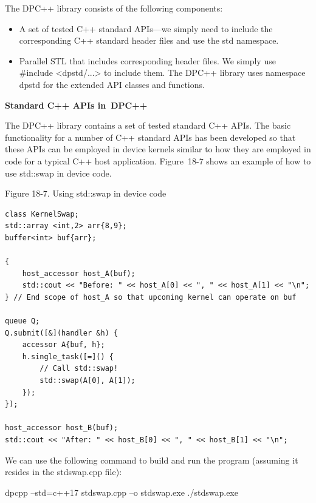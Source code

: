The DPC++ library consists of the following components:\par

\begin{itemize}
	\item A set of tested C++ standard APIs—we simply need to include the corresponding C++ standard header files and use the std namespace.
	\item Parallel STL that includes corresponding header files. We simply use \#include <dpstd/...> to include them. The DPC++ library uses namespace dpstd for the extended API classes and functions.
\end{itemize}

\hspace*{\fill} \par %
\textbf{Standard C++ APIs in DPC++}

The DPC++ library contains a set of tested standard C++ APIs. The basic functionality for a number of C++ standard APIs has been developed so that these APIs can be employed in device kernels similar to how they are employed in code for a typical C++ host application. Figure 18-7 shows an example of how to use std::swap in device code.\par

\hspace*{\fill} \par %
Figure 18-7. Using std::swap in device code
\begin{lstlisting}[caption={}]
class KernelSwap;
std::array <int,2> arr{8,9};
buffer<int> buf{arr};

{
	host_accessor host_A(buf);
	std::cout << "Before: " << host_A[0] << ", " << host_A[1] << "\n";
} // End scope of host_A so that upcoming kernel can operate on buf

queue Q;
Q.submit([&](handler &h) {
	accessor A{buf, h};
	h.single_task([=]() {
		// Call std::swap!
		std::swap(A[0], A[1]);
	});
});

host_accessor host_B(buf);
std::cout << "After: " << host_B[0] << ", " << host_B[1] << "\n";
\end{lstlisting}

We can use the following command to build and run the program (assuming it resides in the stdswap.cpp file):\par

\begin{tcolorbox}[colback=white,colframe=black]
dpcpp –std=c++17 stdswap.cpp –o stdswap.exe ./stdswap.exe
\end{tcolorbox}

